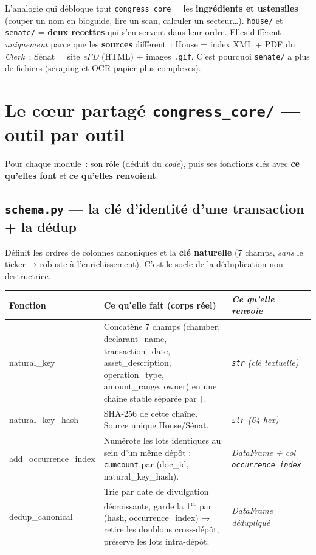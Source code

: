 \documentclass[11pt,a4paper]{article}
\newcommand{\co}[1]{\texttt{\small #1}}
\newenvironment{fntab}{%
  \par\small
  \begin{longtable}{>{\ttfamily\footnotesize}p{3.0cm} p{9.1cm} >{\itshape\footnotesize}p{3.4cm}}
  \toprule
  \normalfont\bfseries Fonction & \bfseries Ce qu'elle fait (corps réel) & \normalfont\bfseries Ce qu'elle renvoie\\
  \midrule\endhead
}{\bottomrule\end{longtable}\par}
\begin{document}
\begin{keybox}{L'analogie qui débloque tout}
\co{congress_core} = les \textbf{ingrédients et ustensiles} (couper un nom en bioguide, lire un scan,
calculer un secteur\dots). \co{house/} et \co{senate/} = \textbf{deux recettes} qui s'en servent dans
leur ordre. Elles diffèrent \emph{uniquement} parce que les \textbf{sources} diffèrent~: House = index
XML + PDF du \emph{Clerk}~; Sénat = site \emph{eFD} (HTML) + images \co{.gif}. C'est pourquoi
\co{senate/} a plus de fichiers (scraping et OCR papier plus complexes).
\end{keybox}

\section{Le cœur partagé \texttt{congress\_core/} — outil par outil}

Pour chaque module~: son rôle (déduit du \emph{code}), puis ses fonctions clés avec \textbf{ce qu'elles
font} et \textbf{ce qu'elles renvoient}.

\subsection{\texttt{schema.py} — la clé d'identité d'une transaction + la dédup}
Définit les ordres de colonnes canoniques et la \textbf{clé naturelle} (7 champs, \emph{sans} le ticker
→ robuste à l'enrichissement). C'est le socle de la déduplication non destructrice.
\begin{fntab}
natural_key & Concatène 7 champs (chamber, declarant\_name, transaction\_date, asset\_description, operation\_type, amount\_range, owner) en une chaîne stable séparée par \co{|}. & \co{str} (clé textuelle) \\
natural_key_hash & SHA-256 de cette chaîne. Source unique House/Sénat. & \co{str} (64 hex) \\
add_occurrence_index & Numérote les lots identiques au sein d'un même dépôt : \co{cumcount} par (doc\_id, natural\_key\_hash). & DataFrame + col \co{occurrence_index} \\
dedup_canonical & Trie par date de divulgation décroissante, garde la 1\textsuperscript{re} par (hash, occurrence\_index) → retire les doublons cross-dépôt, préserve les lots intra-dépôt. & DataFrame dédupliqué \\
\end{fntab}
\end{document}
